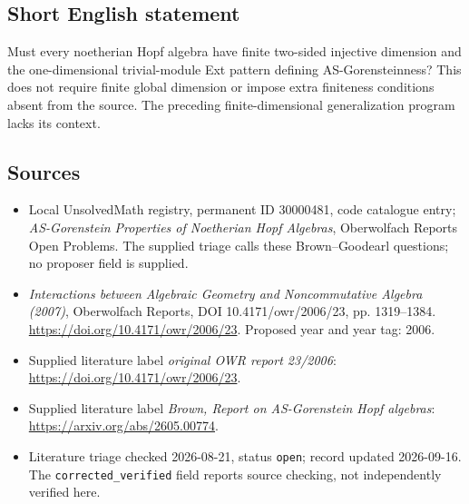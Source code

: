\documentclass[11pt]{article}
\begin{document}
\subsection{Short English statement}
Must every noetherian Hopf algebra have finite two-sided injective dimension and the one-dimensional trivial-module Ext pattern defining AS-Gorensteinness? This does not require finite global dimension or impose extra finiteness conditions absent from the source. The preceding finite-dimensional generalization program lacks its context.
\subsection{Sources}
\begin{itemize}\item Local UnsolvedMath registry, permanent ID 30000481, code catalogue entry; \emph{AS-Gorenstein Properties of Noetherian Hopf Algebras}, Oberwolfach Reports Open Problems. The supplied triage calls these Brown--Goodearl questions; no proposer field is supplied.\item \emph{Interactions between Algebraic Geometry and Noncommutative Algebra (2007)}, Oberwolfach Reports, DOI 10.4171/owr/2006/23, pp. 1319--1384. \url{https://doi.org/10.4171/owr/2006/23}. Proposed year and year tag: 2006.\item Supplied literature label \emph{original OWR report 23/2006}: \url{https://doi.org/10.4171/owr/2006/23}.\item Supplied literature label \emph{Brown, Report on AS-Gorenstein Hopf algebras}: \url{https://arxiv.org/abs/2605.00774}.\item Literature triage checked 2026-08-21, status \texttt{open}; record updated 2026-09-16. The \texttt{corrected\_verified} field reports source checking, not independently verified here.\end{itemize}
\end{document}
